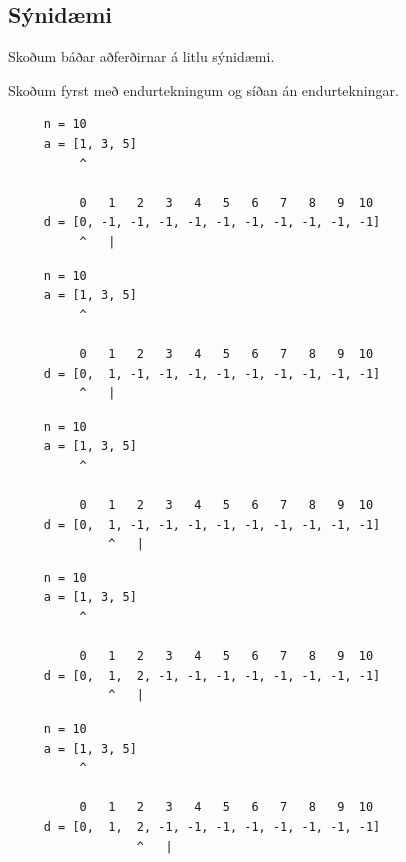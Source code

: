 \subsection{Sýnidæmi}
{
    {
        \item<1-> Skoðum báðar aðferðirnar á litlu sýnidæmi.
        \item<2-> Skoðum fyrst með endurtekningum og síðan án endurtekningar.
    }
}

\begin{frame}[fragile]
\begin{verbatim}
     n = 10
     a = [1, 3, 5]
          ^

          0   1   2   3   4   5   6   7   8   9  10
     d = [0, -1, -1, -1, -1, -1, -1, -1, -1, -1, -1]
          ^   |
\end{verbatim}
\end{frame}
\addtocounter{framenumber}{-1}

\begin{frame}[fragile]
\begin{verbatim}
     n = 10
     a = [1, 3, 5]
          ^

          0   1   2   3   4   5   6   7   8   9  10
     d = [0,  1, -1, -1, -1, -1, -1, -1, -1, -1, -1]
          ^   |
\end{verbatim}
\end{frame}
\addtocounter{framenumber}{-1}

\begin{frame}[fragile]
\begin{verbatim}
     n = 10
     a = [1, 3, 5]
          ^

          0   1   2   3   4   5   6   7   8   9  10
     d = [0,  1, -1, -1, -1, -1, -1, -1, -1, -1, -1]
              ^   |
\end{verbatim}
\end{frame}
\addtocounter{framenumber}{-1}

\begin{frame}[fragile]
\begin{verbatim}
     n = 10
     a = [1, 3, 5]
          ^

          0   1   2   3   4   5   6   7   8   9  10
     d = [0,  1,  2, -1, -1, -1, -1, -1, -1, -1, -1]
              ^   |
\end{verbatim}
\end{frame}
\addtocounter{framenumber}{-1}

\begin{frame}[fragile]
\begin{verbatim}
     n = 10
     a = [1, 3, 5]
          ^

          0   1   2   3   4   5   6   7   8   9  10
     d = [0,  1,  2, -1, -1, -1, -1, -1, -1, -1, -1]
                  ^   |
\end{verbatim}
\end{frame}
\addtocounter{framenumber}{-1}

